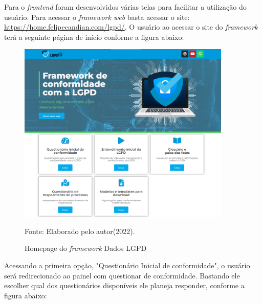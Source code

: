 \documentclass[
	12pt,				%
	openright,			%
	oneside,			%
	a4paper,			%
	english,			%
	french,				%
	spanish,			%
	brazil,				%
	]{abntex2}
\begin{document}
Para o \textit{frontend} foram desenvolvidos várias telas para facilitar a utilização do usuário. Para acessar o \textit{framework web} basta acessar o site:  \url{https://home.felipecandian.com/lgpd/}.
O usuário ao acessar o site do \textit{framework} terá a seguinte página de início conforme a figura abaixo:

\begin{figure}[ht]
    \centering
    \caption{Homepage do \textit{framework} Dados LGPD}
    \includegraphics[width=4.0in]{Images/homepag.png}
    \label{fig: homepage}
    
    \centering \small Fonte: Elaborado pelo autor(2022).
\end{figure}

Acessando a primeira opção, "Questionário Inicial de conformidade", o usuário será redirecionado ao painel com questionar de conformidade. Bastando ele escolher qual dos questionários disponíveis ele planeja responder, conforme a figura abaixo:
\end{document}
